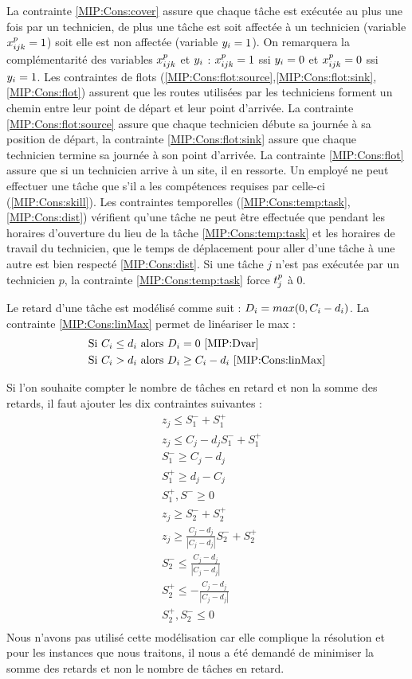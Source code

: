 La contrainte \eqref{MIP:Cons:cover} assure que chaque tâche est exécutée au plus une fois par un technicien, de plus une tâche est soit affectée à un technicien (variable $x_{ijk}^{p}=1$) soit elle est non affectée (variable $y_{i}=1$). 
On remarquera la complémentarité des variables $x_{ijk}^{p}$ et $y_{i}$ : $x_{ijk}^{p}=1$ ssi $y_{i}=0$ et $x_{ijk}^{p}=0$ ssi $y_{i}=1$. 
Les contraintes de flots (\eqref{MIP:Cons:flot:source},\eqref{MIP:Cons:flot:sink},\eqref{MIP:Cons:flot}) assurent que les routes utilisées par les techniciens forment un chemin entre leur point de départ et leur point d'arrivée. 
La contrainte \eqref{MIP:Cons:flot:source} assure que chaque technicien débute sa journée à sa position de départ, la contrainte \eqref{MIP:Cons:flot:sink} assure que chaque technicien termine sa journée à son point d'arrivée. 
La contrainte \eqref{MIP:Cons:flot} assure que si un technicien arrive à un site, il en ressorte. 
Un employé ne peut effectuer une tâche que s'il a les compétences requises par celle-ci (\eqref{MIP:Cons:skill}). Les contraintes temporelles (\eqref{MIP:Cons:temp:task},\eqref{MIP:Cons:dist}) vérifient qu'une tâche ne peut être effectuée que pendant les horaires d'ouverture du lieu de la tâche \eqref{MIP:Cons:temp:task} et les horaires de travail du technicien, que le temps de déplacement pour aller d'une tâche à une autre est bien respecté \eqref{MIP:Cons:dist}. Si une tâche $j$ n'est pas exécutée par un technicien $p$, la contrainte \eqref{MIP:Cons:temp:task} force $t_{j}^{p}$ à 0. 

Le retard d'une tâche est modélisé comme suit : $D_{i} = max(0,C_i - d_i)$. La contrainte \eqref{MIP:Cons:linMax} permet de linéariser le max : 
\begin{align*}
&\text{Si } C_i \leq d_i \text{ alors } D_{i} = 0 \text{ \eqref{MIP:Dvar}} \\
&\text{Si } C_i > d_i \text{ alors } D_{i} \geq C_i - d_i \text{ \eqref{MIP:Cons:linMax}}
\end{align*}

Si l'on souhaite compter le nombre de tâches en retard et non la somme des retards, il faut ajouter les dix contraintes suivantes :
\begin{align*}
 &z_j \leq S_1^{-} + S_1^{+}\\
 &z_j \leq C_j-d_jS_1^{-} + S_1^{+} \\
 &S_1^{-} \geq C_j - d_j\\
 &S_1^{+} \geq d_j - C_j\\
 &S_1^{+},S^{-} \geq 0\\
 &z_j \geq S_2^{-} + S_2^{+} \\
 &z_j \geq \frac{C_j-d_j}{|C_j-d_j|}S_2^{-} + S_2^{+} \\
 &S_2^{-} \leq \frac{C_j-d_j}{|C_j-d_j|}\\
 &S_2^{+} \leq - \frac{C_j-d_j}{|C_j-d_j|}\\
 &S_2^{+},S_2^{-} \leq 0\\
\end{align*}
Nous n'avons pas utilisé cette modélisation car elle complique la résolution et pour les instances que nous traitons, il nous a été demandé de minimiser la somme des retards et non le nombre de tâches en retard.


